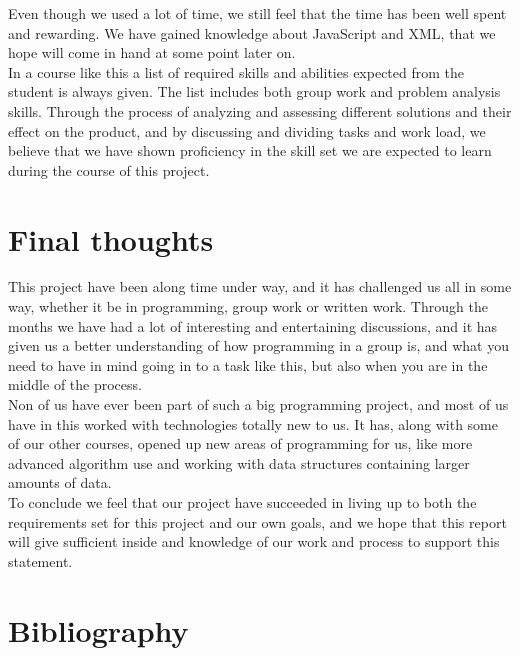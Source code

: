 \documentclass[a4paper,10pt,titlepage]{article}
\begin{document}
Even though we used a lot of time, we still feel that the time has been well spent and rewarding. We have gained knowledge about JavaScript and XML, that we hope will come in hand at some point later on.\\

In a course like this a list of required skills and abilities expected from the student is always given. The list includes both group work and problem analysis skills. Through the process of analyzing and assessing different solutions and their effect on the product, and by discussing and dividing tasks and work load, we believe that we have shown proficiency in the skill set we are expected to learn during the course of this project.

	 
	\newpage
	
	\section{Final thoughts}
	This project have been along time under way, and it has challenged us all in some way, whether it be in programming, group work or written work. Through the months we have had a lot of interesting and entertaining discussions, and it has given us a better understanding of how programming in a group is, and what you need to have in mind going in to a task like this, but also when you are in the middle of the process.\\

Non of us have ever been part of such a big programming project, and most of us have in this worked with technologies totally new to us. It has, along with some of our other courses, opened up new areas of programming for us, like more advanced algorithm use and working with data structures containing larger amounts of data.\\

To conclude we feel that our project have succeeded in living up to both the requirements set for this project and our own goals, and we hope that this report will give sufficient inside and knowledge of our work and process to support this statement.\\
	
	\newpage	
	
	\section{Bibliography}
	
\end{document}
